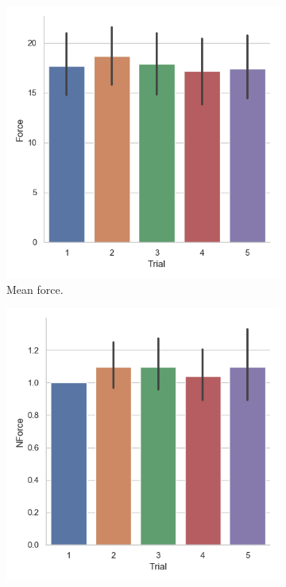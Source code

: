 \begin{figure}[H]
     \begin{subfigure}[b]{0.3\textwidth}
         \centering
         \includegraphics[scale=0.4]{Files/Plots/force_mean_by_trial.png}
         \caption{Mean force.}
         \label{fig:forceMeanTrial}
     \end{subfigure}
     \begin{subfigure}[b]{0.3\textwidth}
         \centering
         \includegraphics[scale=0.4]{Files/Plots/forceNforce_mean_by_trial.png}

\end{subfigure}
\end{figure}
